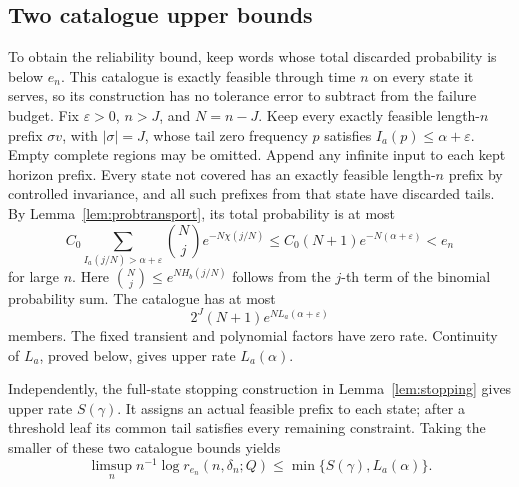 \documentclass[11pt]{amsart}
\theoremstyle{definition}
\theoremstyle{remark}
\numberwithin{equation}{section}
\begin{document}
\subsection{Two catalogue upper bounds}
To obtain the reliability bound, keep words whose total discarded
probability is below $e_n$. This catalogue is exactly feasible
through time $n$ on every state it serves, so its construction has
no tolerance error to subtract from the failure budget.
Fix $\varepsilon>0$, $n>J$, and $N=n-J$.
Keep every exactly feasible length-$n$ prefix $\sigma v$, with
$|\sigma|=J$, whose tail zero frequency $p$ satisfies
$I_a(p)\le\alpha+\varepsilon$. Empty complete regions may be omitted.
Append any infinite input to each kept horizon prefix.
Every state not covered has an exactly feasible length-$n$ prefix
by controlled invariance, and all such prefixes from that state
have discarded tails. By Lemma~\ref{lem:probtransport}, its total
probability is at most
\begin{equation}\label{eq:reliablefailure}
C_0\sum_{I_a(j/N)>\alpha+\varepsilon}
\binom Nj e^{-N\chi(j/N)}
\le C_0(N+1)e^{-N(\alpha+\varepsilon)}<e_n
\end{equation}
for large $n$. Here $\binom Nj\le e^{NH_b(j/N)}$ follows
from the $j$-th term of the binomial probability sum. The catalogue
has at most
\begin{equation}\label{eq:reliablecount}
2^J(N+1)e^{N L_a(\alpha+\varepsilon)}
\end{equation}
members. The fixed transient and polynomial factors have zero rate.
Continuity of $L_a$, proved below, gives upper rate $L_a(\alpha)$.

Independently, the full-state stopping construction in
Lemma~\ref{lem:stopping} gives upper rate $S(\gamma)$.
It assigns an actual feasible prefix to each state; after a threshold
leaf its common tail satisfies every remaining constraint.
Taking the smaller of these two catalogue bounds yields
\begin{equation}\label{eq:reliableupper}
\limsup_n n^{-1}\log r_{e_n}(n,\delta_n;Q)
                       \le\min\{S(\gamma),L_a(\alpha)\}.
\end{equation}
\end{document}
